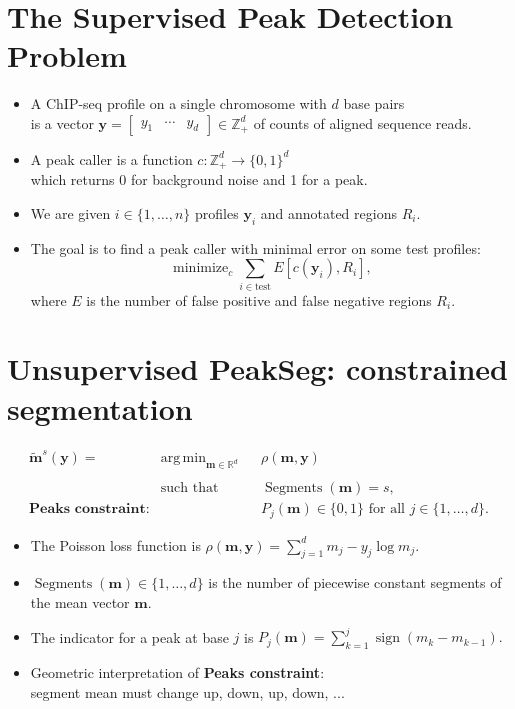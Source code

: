 \documentclass[legalpaper]{article}
\newcommand{\ZZ}{\mathbb Z}
\newcommand{\RR}{\mathbb R}
\DeclareMathOperator*{\minimize}{minimize}
\DeclareMathOperator*{\sign}{sign}
\DeclareMathOperator*{\argmin}{arg\,min}
\DeclareMathOperator*{\Segments}{Segments}
\begin{document}
\section*{The Supervised Peak Detection Problem}

\begin{itemize}
\item A ChIP-seq profile on a single
chromosome with $d$ base pairs\\ is a vector $\mathbf y=
\left[
  \begin{array}{ccc}
    y_1 & \cdots & y_d
  \end{array}
\right]\in\ZZ_+^d$ of counts of aligned sequence reads. 
\item A peak caller is a function $c:\ZZ_+^d
  \rightarrow \{0, 1\}^d$\\
  which returns 0 for background noise and 1 for a peak.
\item We are given $i\in\{1,\dots, n\}$ profiles 
  $\mathbf y_i$ and annotated regions $R_i$.
\item The goal is to find a peak caller with minimal error on some
test profiles:
\begin{equation*}
  \label{eq:min_error}
  \minimize_c \sum_{i\in\text{test}} E[c(\mathbf y_i),  R_i],
\end{equation*}
where $E$ is the number of false positive and false negative regions $R_i$.
\end{itemize}

\newpage 

\section*{Unsupervised PeakSeg: 
constrained segmentation}

\begin{equation*}
  \label{argmin:constrained}
  \begin{aligned}
    \mathbf{\tilde m}^s(\mathbf y)  =\ 
    &\argmin_{\mathbf m\in\RR^{d}} && 
    \rho
    (\mathbf m, \mathbf y) \\
    \\
    &\text{such that} && \Segments(\mathbf m)=s,\\
    \textbf{Peaks constraint:}
    & && P_j(\mathbf m) \in\{0, 1\} \text{ for all } j\in\{1, \dots, d\}.
  \end{aligned}
\end{equation*}
\begin{itemize}
\item The Poisson loss function is $\rho(\mathbf m, \mathbf y)=
  \sum_{j=1}^d m_j - y_j \log m_j$.
\item$\Segments(\mathbf m)\in\{1, \dots, d\}$ is the number of
  piecewise constant segments of the mean vector $\mathbf m$.
\item The indicator for a peak at base $j$ is 
$
  P_j(\mathbf m) = \sum_{k=1}^j \sign( m_k - m_{k-1} ).
$
\item Geometric interpretation of \textbf{Peaks constraint}:\\
  segment mean must change up, down, up, down, ...
\end{itemize}
\end{document}
